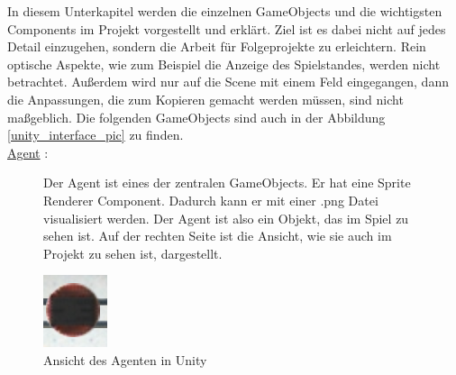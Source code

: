 In diesem Unterkapitel werden die einzelnen GameObjects und die wichtigsten Components im Projekt vorgestellt und erklärt. Ziel ist es dabei nicht auf jedes Detail einzugehen, sondern die Arbeit für Folgeprojekte zu erleichtern. Rein optische Aspekte, wie zum Beispiel die Anzeige des Spielstandes, werden nicht betrachtet. Außerdem wird nur auf die Scene mit einem Feld eingegangen, dann die Anpassungen, die zum Kopieren gemacht werden müssen, sind nicht maßgeblich. Die folgenden GameObjects sind auch in der Abbildung \ref{unity_interface_pic} zu finden.\\

\underline{Agent} :

\begin{figure} [h]

\begin{minipage}[t]{0.6\textwidth}
\vspace{0pt}
Der Agent ist eines der zentralen GameObjects. Er hat eine Sprite Renderer Component. Dadurch kann er mit einer .png Datei visualisiert werden. Der Agent ist also ein Objekt, das im Spiel zu sehen ist. Auf der rechten Seite ist die Ansicht, wie sie auch im Projekt zu sehen ist, dargestellt.
\end{minipage}
\hspace{0.1\textwidth}
\begin{minipage}[t]{0.2\textwidth}
\vspace{0pt}
\includegraphics[width=\textwidth]{images/agent_unity}
 \caption{Ansicht des Agenten in Unity}
 \label{unity_agent}
\end{minipage}
\end{figure}

